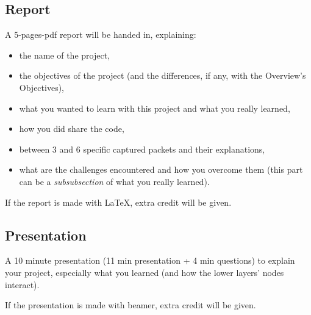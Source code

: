 \documentclass[11pt]{article}
\begin{document}
\subsection{Report}
A 5-pages-pdf report will be handed in, explaining:
  \begin{itemize}
    \item the name of the project,
    \item the objectives of the project (and the differences, if any, with the Overview's Objectives),
    \item what you wanted to learn with this project and what you really learned,
    \item how you did share the code,
    \item between 3 and 6 specific captured packets and their explanations,
    \item what are the challenges encountered and how you overcome them (this part can be a \emph{subsubsection} of what you really learned).
  \end{itemize}
If the report is made with \LaTeX, extra credit will be given.

\subsection{Presentation}
A 10 minute presentation (11 min presentation + 4 min questions) to explain your project, especially what you learned (and how the lower layers' nodes interact).

If the presentation is made with beamer, extra credit will be given.
\end{document}
